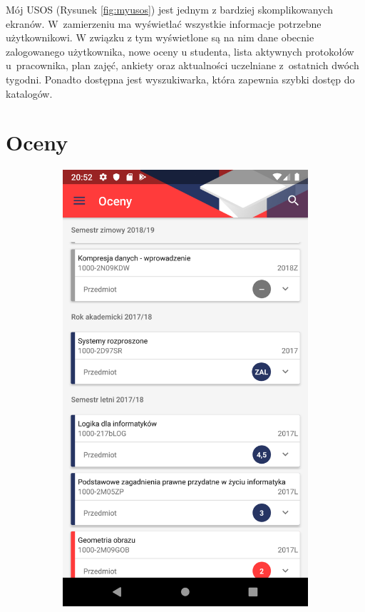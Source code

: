 \documentclass{pracamgr}
\begin{document}
Mój USOS (Rysunek \ref{fig:myusos}) jest jednym z bardziej skomplikowanych ekranów. W~zamierzeniu ma wyświetlać
wszystkie informacje potrzebne użytkownikowi. W związku z tym wyświetlone są na nim
dane obecnie zalogowanego użytkownika, nowe oceny u studenta, lista aktywnych protokołów
u~pracownika, plan zajęć, ankiety oraz aktualności uczelniane z~ostatnich dwóch tygodni.
Ponadto dostępna jest wyszukiwarka, która zapewnia szybki dostęp do katalogów.

\section{Oceny}

\begin{figure}[p]
	\centering
	\begin{subfigure}[t]{0.3\textwidth}
		\includegraphics[width=\textwidth]{img/grades_list.png}

\end{subfigure}
\end{figure}
\end{document}
